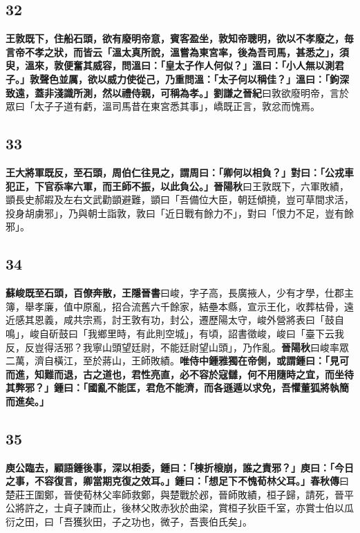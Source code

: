 \subsection*{32}

\textbf{王敦既下，住船石頭，欲有廢明帝意，賓客盈坐，敦知帝聰明，欲以不孝廢之，毎言帝不孝之狀，而皆云「溫太真所說，溫嘗為東宮率，後為吾司馬，甚悉之」，須臾，溫來，敦便奮其威容，問溫曰：「皇太子作人何似？」溫曰：「小人無以測君子。」敦聲色並厲，欲以威力使從己，乃重問溫：「太子何以稱佳？」溫曰：「鉤深致遠，蓋非淺識所測，然以禮侍親，可稱為孝。」}{\footnotesize \textbf{劉謙之晉紀}曰敦欲廢明帝，言於眾曰「太子子道有虧，溫司馬昔在東宮悉其事」，嶠既正言，敦忿而愧焉。}

\subsection*{33}

\textbf{王大將軍既反，至石頭，周伯仁往見之，謂周曰：「卿何以相負？」對曰：「公戎車犯正，下官忝率六軍，而王師不振，以此負公。」}{\footnotesize \textbf{晉陽秋}曰王敦既下，六軍敗績，顗長史郝嘏及左右文武勸顗避難，顗曰「吾備位大臣，朝廷傾撓，豈可草間求活，投身胡虜邪」，乃與朝士詣敦，敦曰「近日戰有餘力不」，對曰「恨力不足，豈有餘邪」。}

\subsection*{34}

\textbf{蘇峻既至石頭，百僚奔散，}{\footnotesize \textbf{王隱晉書}曰峻，字子高，長廣掖人，少有才學，仕郡主簿，舉孝廉，值中原亂，招合流舊六千餘家，結壘本縣，宣示王化，收葬枯骨，遠近感其恩義，咸共宗焉，討王敦有功，封公，遷歷陽太守，峻外營將表曰「鼓自鳴」，峻自斫鼓曰「我鄉里時，有此則空城」，有頃，詔書徵峻，峻曰「臺下云我反，反豈得活邪？我寧山頭望廷尉，不能廷尉望山頭」，乃作亂。\textbf{晉陽秋}曰峻率眾二萬，濟自橫江，至於蔣山，王師敗績。}\textbf{唯侍中鍾雅獨在帝側，或謂鍾曰：「見可而進，知難而退，古之道也，君性亮直，必不容於寇讎，何不用隨時之宜，而坐待其弊邪？」鍾曰：「國亂不能匡，君危不能濟，而各遜遁以求免，吾懼董狐將執簡而進矣。」}

\subsection*{35}

\textbf{庾公臨去，顧語鍾後事，深以相委，鍾曰：「棟折榱崩，誰之責邪？」庾曰：「今日之事，不容復言，卿當期克復之效耳。」鍾曰：「想足下不愧荀林父耳。」}{\footnotesize \textbf{春秋傳}曰楚莊王圍鄭，晉使荀林父率師救鄭，與楚戰於邲，晉師敗績，桓子歸，請死，晉平公將許之，士貞子諫而止，後林父敗赤狄於曲梁，賞桓子狄臣千室，亦賞士伯以瓜衍之田，曰「吾獲狄田，子之功也，微子，吾喪伯氏矣」。}

